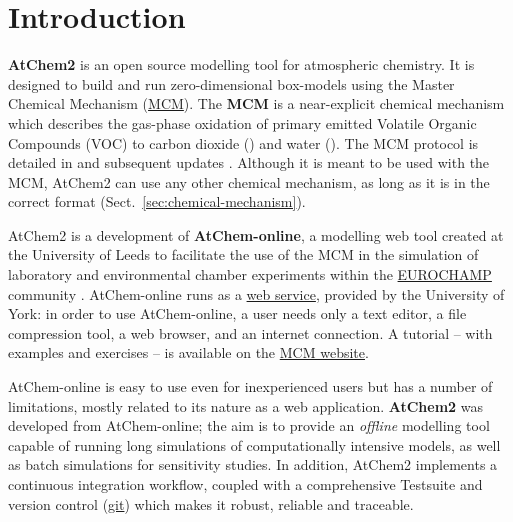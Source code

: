 %
%
%
%

\chapter{Introduction} \label{ch:introduction}

\textbf{AtChem2} is an open source modelling tool for atmospheric
chemistry. It is designed to build and run zero-dimensional
box-models using the Master Chemical Mechanism
(\href{https://mcm.york.ac.uk/MCM}{MCM}). The \textbf{MCM} is a
near-explicit chemical mechanism which describes the gas-phase
oxidation of primary emitted Volatile Organic Compounds (VOC) to
carbon dioxide () and water (). The MCM protocol is
detailed in \citet{jenkin_1997} and subsequent updates
\citep{saunders_2003, jenkin_2003, bloss_2005, jenkin_2012, jenkin_2015}.
Although it is meant to be used with the MCM, AtChem2 can use any
other chemical mechanism, as long as it is in the correct format
(Sect.~\ref{sec:chemical-mechanism}).

AtChem2 is a development of \textbf{AtChem-online}, a modelling web
tool created at the University of Leeds to facilitate the use of the
MCM in the simulation of laboratory and environmental chamber
experiments within the \href{https://www.eurochamp.org}{EUROCHAMP}
community \citep{martin_2009}. AtChem-online runs as a
\href{https://atchem.york.ac.uk}{web service}, provided by the
University of York: in order to use AtChem-online, a user needs only a
text editor, a file compression tool, a web browser, and an internet
connection. A tutorial -- with examples and exercises -- is available on
the \href{https://mcm.york.ac.uk/MCM/atchemonline/intro}{MCM website}.

AtChem-online is easy to use even for inexperienced users but has a
number of limitations, mostly related to its nature as a web
application. \textbf{AtChem2} was developed from AtChem-online; the
aim is to provide an \emph{offline} modelling tool capable of running
long simulations of computationally intensive models, as well as batch
simulations for sensitivity studies. In addition, AtChem2 implements a
continuous integration workflow, coupled with a comprehensive
Testsuite and version control (\href{https://git-scm.com}{git}) which
makes it robust, reliable and traceable.

